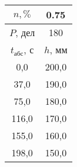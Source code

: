 \begin{tabular}[t]{|c|c|}
\hline
$n, \%$ & 0.75 \\
\hline
$P$, дел & 180 \\
\hline
$t_{абс}$, с & $h$, мм \\ 
\hline
0,0 & 200,0 \\ 
37,0 & 190,0 \\ 
75,0 & 180,0 \\ 
116,0 & 170,0 \\ 
155,0 & 160,0 \\ 
198,0 & 150,0 \\ 
\hline
\end{tabular}